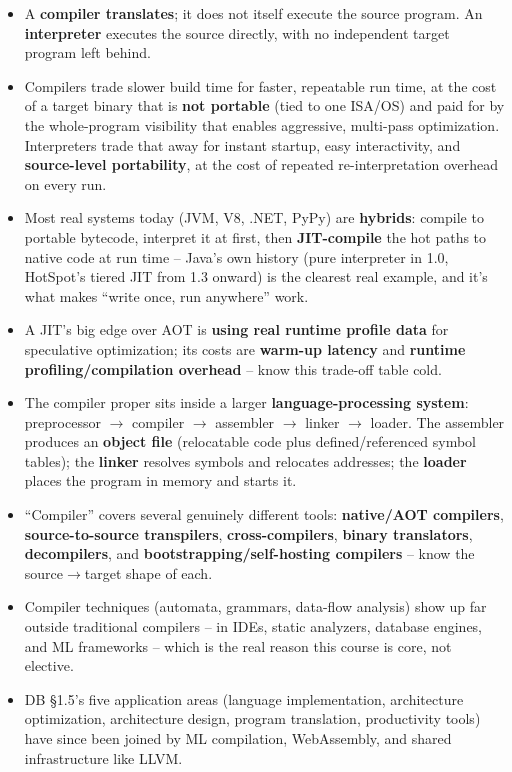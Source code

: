 \documentclass[full-course-notes.tex]{subfiles}
\begin{document}
\begin{takeaways}
\begin{itemize}
  \item A \textbf{compiler translates}; it does not itself execute the source program. An
  \textbf{interpreter} executes the source directly, with no independent target program left
  behind.
  \item Compilers trade slower build time for faster, repeatable run time, at the cost of a
  target binary that is \textbf{not portable} (tied to one ISA/OS) and paid for by the whole-program
  visibility that enables aggressive, multi-pass optimization. Interpreters trade that away for
  instant startup, easy interactivity, and \textbf{source-level portability}, at the cost of
  repeated re-interpretation overhead on every run.
  \item Most real systems today (JVM, V8, .NET, PyPy) are \textbf{hybrids}: compile to portable
  bytecode, interpret it at first, then \textbf{JIT-compile} the hot paths to native code at run
  time -- Java's own history (pure interpreter in 1.0, HotSpot's tiered JIT from 1.3 onward) is
  the clearest real example, and it's what makes ``write once, run anywhere'' work.
  \item A JIT's big edge over AOT is \textbf{using real runtime profile data} for speculative
  optimization; its costs are \textbf{warm-up latency} and \textbf{runtime profiling/compilation
  overhead} -- know this trade-off table cold.
  \item The compiler proper sits inside a larger \textbf{language-processing system}:
  preprocessor $\to$ compiler $\to$ assembler $\to$ linker $\to$ loader. The assembler produces
  an \textbf{object file} (relocatable code plus defined/referenced symbol tables); the
  \textbf{linker} resolves symbols and relocates addresses; the \textbf{loader} places the
  program in memory and starts it.
  \item ``Compiler'' covers several genuinely different tools: \textbf{native/AOT compilers},
  \textbf{source-to-source transpilers}, \textbf{cross-compilers}, \textbf{binary translators},
  \textbf{decompilers}, and \textbf{bootstrapping/self-hosting compilers} -- know the
  source$\to$target shape of each.
  \item Compiler techniques (automata, grammars, data-flow analysis) show up far outside
  traditional compilers -- in IDEs, static analyzers, database engines, and ML frameworks -- which
  is the real reason this course is core, not elective.
  \item DB \S1.5's five application areas (language implementation, architecture optimization,
  architecture design, program translation, productivity tools) have since been joined by
  ML compilation, WebAssembly, and shared infrastructure like LLVM.
\end{itemize}
\end{takeaways}
\end{document}
